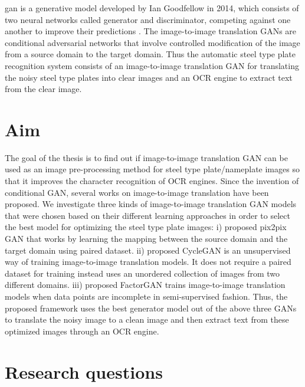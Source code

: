 		\gls{gan} is a generative model developed by Ian Goodfellow in 2014, which consists of two neural networks called generator and discriminator, competing against one another to improve their predictions \citep{goodfellow2014generative}. The image-to-image translation GANs are conditional adversarial networks that involve controlled modification of the image from a source domain to the target domain. Thus the automatic steel type plate recognition system consists of an image-to-image translation GAN for translating the noisy steel type plates into clear images and an OCR engine to extract text from the clear image. 

\section{Aim}
      
		The goal of the thesis is to find out if image-to-image translation GAN can be used as an image pre-processing method for steel type plate/nameplate images so that it improves the character recognition of OCR engines. Since the invention of conditional GAN, several works on image-to-image translation have been proposed. We investigate three kinds of image-to-image translation GAN models that were chosen based on their different learning approaches in order to select the best model for optimizing the steel type plate images: i) \cite{isola2017image} proposed pix2pix GAN that works by learning the mapping between the source domain and the target domain using paired dataset. ii) \cite{CycleGAN2017} proposed CycleGAN is an unsupervised way of training image-to-image translation models. It does not require a paired dataset for training instead uses an unordered collection of images from two different domains. iii)  \cite{stoller2019training} proposed FactorGAN trains image-to-image translation models when data points are incomplete in semi-supervised fashion. Thus, the proposed framework uses the best generator model out of the above three GANs to translate the noisy image to a clean image and then extract text from these optimized images through an OCR engine.
		
\section{Research questions}

